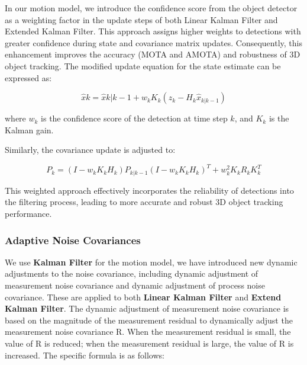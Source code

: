 In our motion model, we introduce the confidence score from the object detector as a weighting factor in the update steps of both Linear Kalman Filter and Extended Kalman Filter. This approach assigns higher weights to detections with greater confidence during state and covariance matrix updates. Consequently, this enhancement improves the accuracy (MOTA and AMOTA) and robustness of 3D object tracking. The modified update equation for the state estimate can be expressed as:

\begin{equation}
\hat{x}k = \hat{x}{k|k-1} + w_k K_k(z_k - H_k\hat{x}_{k|k-1})
\label{eq:XK}
\end{equation}

where $w_k$ is the confidence score of the detection at time step $k$, and $K_k$ is the Kalman gain.

Similarly, the covariance update is adjusted to:

\begin{equation}
P_k = (I - w_kK_kH_k)P_{k|k-1}(I - w_kK_kH_k)^T + w_k^2K_kR_kK_k^T
\label{eq:PK}
\end{equation}

This weighted approach effectively incorporates the reliability of detections into the filtering process, leading to more accurate and robust 3D object tracking performance.

\subsubsection{Adaptive Noise Covariances}

We use \textbf{Kalman Filter} for the motion model, we have introduced new dynamic adjustments to the noise covariance, including dynamic adjustment of measurement noise covariance and dynamic adjustment of process noise covariance. These are applied to both \textbf{Linear Kalman Filter} and \textbf{Extend Kalman Filter}.
The dynamic adjustment of measurement noise covariance is based on the magnitude of the measurement residual to dynamically adjust the measurement noise covariance R. When the measurement residual is small, the value of R is reduced; when the measurement residual is large, the value of R is increased. The specific formula is as follows:

